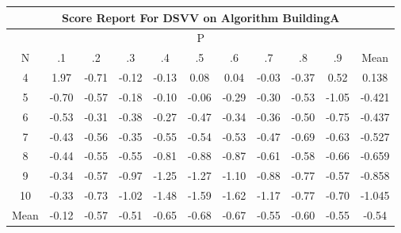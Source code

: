 \documentclass[11pt,a4paper]{report}
\begin{document}
\begin{longtable}{ | c || c | c | c | c | c | c | c | c | c || c |}
\hline
\multicolumn{11}{|c|}{ Score Report For DSVV on Algorithm BuildingA} \\
\hline
\multicolumn{11}{|c|}{ P } \\
\hline
N & .1 & .2 & .3 & .4 & .5 & .6 & .7 & .8 & .9 & Mean\\
 \hline
 \hline
 \endhead
  4 &  \cellcolor[HTML]{CFCFFF} 1.97 &  \cellcolor[HTML]{FFEFEF} -0.71 &  \cellcolor[HTML]{FFFFFF} -0.12 &  \cellcolor[HTML]{FFFFFF} -0.13 &  \cellcolor[HTML]{FFFFFF} 0.08 &  \cellcolor[HTML]{FFFFFF} 0.04 &  \cellcolor[HTML]{FFFFFF} -0.03 &  \cellcolor[HTML]{FFF7F7} -0.37 &  \cellcolor[HTML]{EFEFFF} 0.52 & 0.138 \\
  5 &  \cellcolor[HTML]{FFEFEF} -0.70 &  \cellcolor[HTML]{FFEFEF} -0.57 &  \cellcolor[HTML]{FFF7F7} -0.18 &  \cellcolor[HTML]{FFFFFF} -0.10 &  \cellcolor[HTML]{FFFFFF} -0.06 &  \cellcolor[HTML]{FFF7F7} -0.29 &  \cellcolor[HTML]{FFF7F7} -0.30 &  \cellcolor[HTML]{FFEFEF} -0.53 &  \cellcolor[HTML]{FFE7E7} -1.05 & -0.421 \\
  6 &  \cellcolor[HTML]{FFEFEF} -0.53 &  \cellcolor[HTML]{FFF7F7} -0.31 &  \cellcolor[HTML]{FFF7F7} -0.38 &  \cellcolor[HTML]{FFF7F7} -0.27 &  \cellcolor[HTML]{FFF7F7} -0.47 &  \cellcolor[HTML]{FFF7F7} -0.34 &  \cellcolor[HTML]{FFF7F7} -0.36 &  \cellcolor[HTML]{FFEFEF} -0.50 &  \cellcolor[HTML]{FFEFEF} -0.75 & -0.437 \\
  7 &  \cellcolor[HTML]{FFF7F7} -0.43 &  \cellcolor[HTML]{FFEFEF} -0.56 &  \cellcolor[HTML]{FFF7F7} -0.35 &  \cellcolor[HTML]{FFEFEF} -0.55 &  \cellcolor[HTML]{FFEFEF} -0.54 &  \cellcolor[HTML]{FFEFEF} -0.53 &  \cellcolor[HTML]{FFF7F7} -0.47 &  \cellcolor[HTML]{FFEFEF} -0.69 &  \cellcolor[HTML]{FFEFEF} -0.63 & -0.527 \\
  8 &  \cellcolor[HTML]{FFF7F7} -0.44 &  \cellcolor[HTML]{FFEFEF} -0.55 &  \cellcolor[HTML]{FFEFEF} -0.55 &  \cellcolor[HTML]{FFE7E7} -0.81 &  \cellcolor[HTML]{FFE7E7} -0.88 &  \cellcolor[HTML]{FFE7E7} -0.87 &  \cellcolor[HTML]{FFEFEF} -0.61 &  \cellcolor[HTML]{FFEFEF} -0.58 &  \cellcolor[HTML]{FFEFEF} -0.66 & -0.659 \\
  9 &  \cellcolor[HTML]{FFF7F7} -0.34 &  \cellcolor[HTML]{FFEFEF} -0.57 &  \cellcolor[HTML]{FFE7E7} -0.97 &  \cellcolor[HTML]{FFDFDF} -1.25 &  \cellcolor[HTML]{FFDFDF} -1.27 &  \cellcolor[HTML]{FFE7E7} -1.10 &  \cellcolor[HTML]{FFE7E7} -0.88 &  \cellcolor[HTML]{FFEFEF} -0.77 &  \cellcolor[HTML]{FFEFEF} -0.57 & -0.858 \\
  10 &  \cellcolor[HTML]{FFF7F7} -0.33 &  \cellcolor[HTML]{FFEFEF} -0.73 &  \cellcolor[HTML]{FFE7E7} -1.02 &  \cellcolor[HTML]{FFD7D7} -1.48 &  \cellcolor[HTML]{FFD7D7} -1.59 &  \cellcolor[HTML]{FFD7D7} -1.62 &  \cellcolor[HTML]{FFDFDF} -1.17 &  \cellcolor[HTML]{FFEFEF} -0.77 &  \cellcolor[HTML]{FFEFEF} -0.70 & -1.045 \\
 \hline
 \hline
Mean &  \cellcolor[HTML]{FFFFFF} -0.12 &  \cellcolor[HTML]{FFEFEF} -0.57 &  \cellcolor[HTML]{FFEFEF} -0.51 &  \cellcolor[HTML]{FFEFEF} -0.65 &  \cellcolor[HTML]{FFEFEF} -0.68 &  \cellcolor[HTML]{FFEFEF} -0.67 &  \cellcolor[HTML]{FFEFEF} -0.55 &  \cellcolor[HTML]{FFEFEF} -0.60 &  \cellcolor[HTML]{FFEFEF} -0.55 &  \cellcolor[HTML]{FFEFEF} -0.54
\end{longtable}
\end{document}
